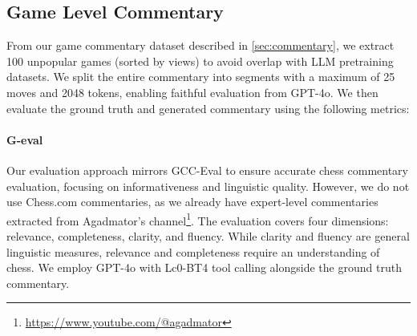 \begin{table}[!h]
    \label{tab:gameplay-performance}
\end{table}

\subsection{Game Level Commentary}
From our game commentary dataset described in \cref{sec:commentary}, we extract 100 unpopular games (sorted by views) to avoid overlap with LLM pretraining datasets. We split the entire commentary into segments with a maximum of 25 moves and 2048 tokens, enabling faithful evaluation from GPT-4o. We then evaluate the ground truth and generated commentary using the following metrics:

\paragraph{G-eval}
Our evaluation approach mirrors GCC-Eval \cite{kim2024bridging} to ensure accurate chess commentary evaluation, focusing on informativeness and linguistic quality. However, we do not use Chess.com commentaries, as we already have expert-level commentaries extracted from Agadmator's channel\footnote{\url{https://www.youtube.com/@agadmator}}. The evaluation covers four dimensions: relevance, completeness, clarity, and fluency. While clarity and fluency are general linguistic measures, relevance and completeness require an understanding of chess. We employ GPT-4o with Lc0-BT4 tool calling alongside the ground truth commentary.


